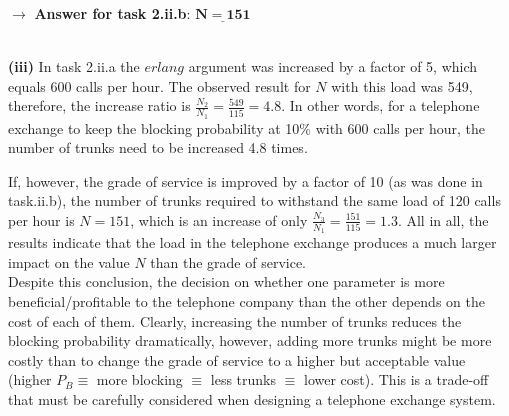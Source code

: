 \centerline{$\rightarrow$\textbf{ Answer for task 2.ii.b}: \large$\underline{\mathbf{N=151}}$}\normalsize ~\\

\large\textbf{(iii)} \normalsize
In task 2.ii.a the $erlang$ argument was increased by a factor of 5, which equals 600 calls per hour. The observed result for $N$  with this load was 549, therefore, the increase ratio is $\frac{N_2}{N_1} = \frac{549}{115} = \mathbf{4.8}$. In other words, for a telephone exchange to keep the blocking probability at 10\% with 600 calls per hour, the number of trunks need to be increased 4.8 times.

If, however, the grade of service is improved by a factor of 10 (as was done in task.ii.b), the number of trunks required to withstand the same load of 120 calls per hour is $N=151$, which is an increase of only $\frac{N_3}{N_1} = \frac{151}{115} = \mathbf{1.3}$. All in all, the results indicate that the load in the telephone exchange produces a much larger impact on the value $N$ than the grade of service.\\

Despite this conclusion, the decision on whether one parameter is more beneficial/profitable to the telephone company than the other depends on the cost of each of them. Clearly, increasing the number of trunks reduces the blocking probability dramatically, however, adding more trunks might be more costly than to change the grade of service to a higher but acceptable value (higher $P_B\equiv$  more blocking $\equiv$ less trunks $\equiv$ lower cost). This is a trade-off that must be carefully considered when designing a telephone exchange system.
\newpage